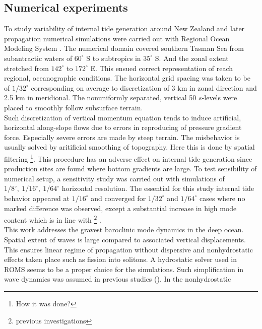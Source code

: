 \documentclass[12pt]{article}
\begin{document}
\subsection{Numerical experiments}
To study variability of internal tide generation around New Zealand and later propagation numerical 
simulations were carried out with Regional Ocean Modeling System \citep{shchepetkin2005regional}. 
The numerical domain covered southern Tasman Sea from subantractic waters of $60^{\circ}$ S 
to subtropics in $35^{\circ}$ S. And the zonal extent stretched from $142^{\circ}$ to $172^{\circ}$ 
E. This ensued correct representation of reach regional, oceanographic conditions. The horizontal 
grid spacing was taken to be of $1/32^{\circ}$ corresponding on average to discretization of 3 km 
in zonal direction and 2.5 km in meridional. The nonuniformly separated, vertical 50 $s$-levels 
were placed to smoothly follow subsurface terrain.\\
Such discretization of vertical momentum equation tends to induce artificial, horizontal  
along-slope flows \citep{haidvogel1999numerical} due to errors in reproducing of pressure 
gradient force. Especially severe errors are made by steep terrain. The misbehavior is usually 
solved by aritificial smoothing of topography. Here this is done by spatial filtering 
\footnote{How it was done?}. This procedure has an adverse effect on internal tide generation  
\citep{di2006numerical} since production sites are found where bottom gradients are large. To 
test sensibility of numerical setup, a sensitivity study was carried out with simulations of  
$1/8^{\circ},~1/16^{\circ},~1/64^{\circ}$ horizontal resolution. The essential for this study 
internal tide behavior appeared at $1/16^{\circ}$ and converged for $1/32^{\circ}$ and 
$1/64^{\circ}$ cases where no marked difference was observed, except a substantial increase in 
high mode content which is in line with \footnote{previous investigations} 
\citep{di2006numerical}.\\
This work addresses the gravest baroclinic mode dynamics in the deep ocean. Spatial extent of 
waves is large compared to associated vertical displacements. This ensures linear regime of 
propagation without dispersive and nonhydrostatic effects taken place such as fission into 
solitons. A hydrostatic solver used in ROMS seems to be a proper choice for the simulations. Such 
simplification in wave dynamics was assumed in previous studies (\citep{carter2008energetics, 
merrifield2001generation,  merrifield2002model, kerry2013effects}). In the nonhydrostatic 
\end{document}
